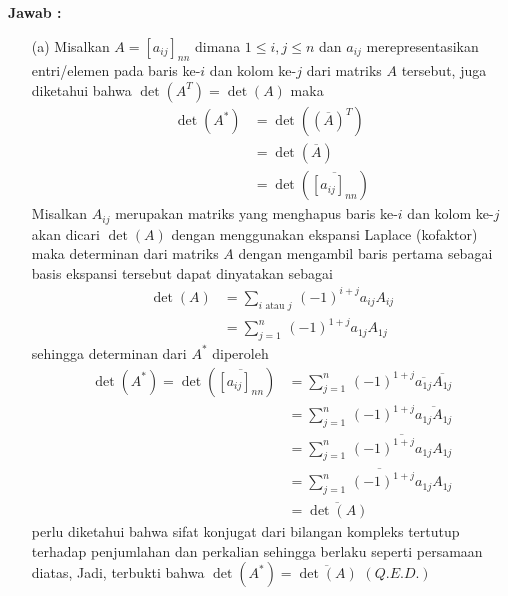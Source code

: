 \documentclass[11pt,a4paper]{article}
\newcommand{\ds}{\displaystyle}
\theoremstyle{plain}
\theoremstyle{definition}
\theoremstyle{remark}
\begin{document}
\begin{enumerate}
\begin{enumerate}
		\textbf{Jawab :}
		
		\begin{enumerate}
			\item[(a)] Misalkan $A=\left[a_{ij}\right]_{nn}$ dimana $1\le i,j\le n$ dan $a_{ij}$ merepresentasikan entri/elemen pada baris ke-$i$ dan kolom ke-$j$ dari matriks $A$ tersebut, juga diketahui bahwa $\det(A^{T})=\det(A)$ maka
			\begin{align*}
			\det(A^*) &=\det\left(\left(\overline{A}\right)^{T}\right) \\
			&= \det(\overline{A}) \\
			&= \det(\overline{\left[a_{ij}\right]_{nn}})
			\end{align*}
			Misalkan $A_{ij}$ merupakan matriks yang menghapus baris ke-$i$ dan kolom ke-$j$ akan dicari $\det(A)$ dengan menggunakan ekspansi Laplace (kofaktor) maka determinan dari matriks $A$ dengan mengambil baris pertama sebagai basis ekspansi tersebut dapat dinyatakan sebagai
			\begin{align*}
			\det(A) &= \ds \sum_{i\text{ atau }j}\, (-1)^{i+j}a_{ij}A_{ij} \\
			&= \ds \sum_{j=1}^{n}\, (-1)^{1+j}a_{1j}A_{1j} 
			\end{align*}
			sehingga determinan dari $A^*$ diperoleh
			\begin{align*}
			\det(A^*)=\det(\overline{\left[a_{ij}\right]_{nn}}) &= \ds \sum_{j=1}^{n}\, (-1)^{1+j}\overline{a_{1j}}\overline{A_{1j}} \\
			&= \ds \sum_{j=1}^{n}\, (-1)^{1+j}\overline{a_{1j}A_{1j}} \\
			&= \ds \sum_{j=1}^{n}\, \overline{(-1)^{1+j}a_{1j}A_{1j}} \\
			&= \ds \overline{\sum_{j=1}^{n}\, (-1)^{1+j}a_{1j}A_{1j}} \\
			&= \overline{\det(A)} 
			\end{align*}
			perlu diketahui bahwa sifat konjugat dari bilangan kompleks tertutup terhadap penjumlahan dan perkalian sehingga berlaku seperti persamaan diatas, Jadi, terbukti bahwa $\det(A^*)=\overline{\det(A)}$ $(Q.E.D.)$
			

\end{enumerate}
\end{enumerate}
\end{enumerate}
\end{document}
